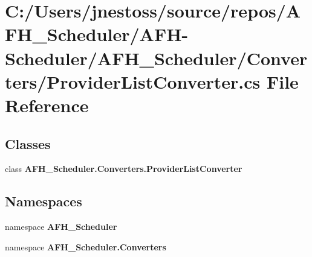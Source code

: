 \section{C\+:/\+Users/jnestoss/source/repos/\+A\+F\+H\+\_\+\+Scheduler/\+A\+F\+H-\/\+Scheduler/\+A\+F\+H\+\_\+\+Scheduler/\+Converters/\+Provider\+List\+Converter.cs File Reference}
\label{_provider_list_converter_8cs}
\subsection*{Classes}
\begin{DoxyCompactItemize}
\item 
class \textbf{ A\+F\+H\+\_\+\+Scheduler.\+Converters.\+Provider\+List\+Converter}
\end{DoxyCompactItemize}
\subsection*{Namespaces}
\begin{DoxyCompactItemize}
\item 
namespace \textbf{ A\+F\+H\+\_\+\+Scheduler}
\item 
namespace \textbf{ A\+F\+H\+\_\+\+Scheduler.\+Converters}
\end{DoxyCompactItemize}
